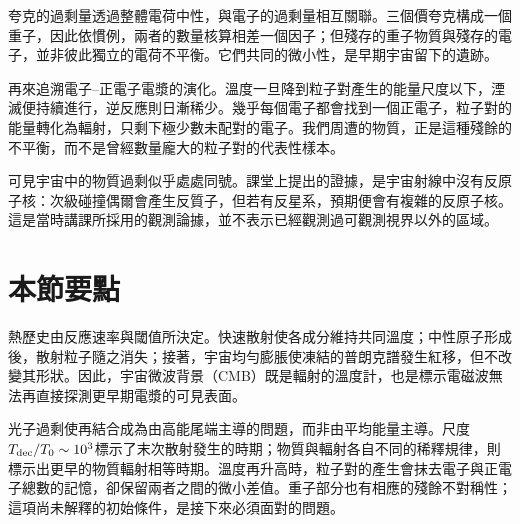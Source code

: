 夸克的過剩量透過整體電荷中性，與電子的過剩量相互關聯。三個價夸克構成一個重子，因此依慣例，兩者的數量核算相差一個因子；但殘存的重子物質與殘存的電子，並非彼此獨立的電荷不平衡。它們共同的微小性，是早期宇宙留下的遺跡。

再來追溯電子--正電子電漿的演化。溫度一旦降到粒子對產生的能量尺度以下，湮滅便持續進行，逆反應則日漸稀少。幾乎每個電子都會找到一個正電子，粒子對的能量轉化為輻射，只剩下極少數未配對的電子。我們周遭的物質，正是這種殘餘的不平衡，而不是曾經數量龐大的粒子對的代表性樣本。

\begin{classroomqa}
\end{classroomqa}

可見宇宙中的物質過剩似乎處處同號。課堂上提出的證據，是宇宙射線中沒有反原子核：次級碰撞偶爾會產生反質子，但若有反星系，預期便會有複雜的反原子核。這是當時講課所採用的觀測論據，並不表示已經觀測過可觀測視界以外的區域。

\begin{classroomqa}
\end{classroomqa}

\begin{classroomqa}
\end{classroomqa}

\section{本節要點}

熱歷史由反應速率與閾值所決定。快速散射使各成分維持共同溫度；中性原子形成後，散射粒子隨之消失；接著，宇宙均勻膨脹使凍結的普朗克譜發生紅移，但不改變其形狀。因此，宇宙微波背景（CMB）既是輻射的溫度計，也是標示電磁波無法再直接探測更早期電漿的可見表面。

光子過剩使再結合成為由高能尾端主導的問題，而非由平均能量主導。尺度\(T_{\rm dec}/T_0\sim10^3\)標示了末次散射發生的時期；物質與輻射各自不同的稀釋規律，則標示出更早的物質輻射相等時期。溫度再升高時，粒子對的產生會抹去電子與正電子總數的記憶，卻保留兩者之間的微小差值。重子部分也有相應的殘餘不對稱性；這項尚未解釋的初始條件，是接下來必須面對的問題。

